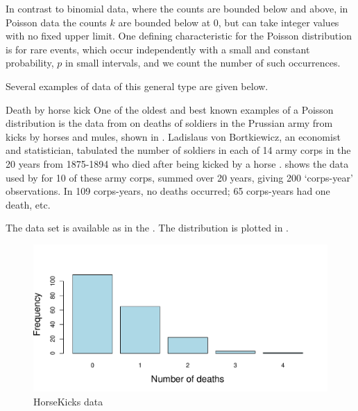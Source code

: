 \documentclass[11pt]{book}
\renewenvironment{knitrout}{\small\renewcommand{\baselinestretch}{.85}}{} %
\begin{document}
In contrast to binomial data, where the counts are bounded below and above,
in Poisson data the counts $k$ are bounded below at 0, but can take integer
values with no fixed upper limit.
One defining characteristic for the Poisson distribution is for rare
events, which occur independently with a small and constant probability, $p$
in small intervals, and we count the number of such occurrences.

Several examples of data of this general type are given below.

\begin{Example}[horskick1]{Death by horse kick}
One of the oldest and best known examples of a Poisson distribution
is the data from
\citet{Bortkiewicz:98} on deaths of soldiers in the Prussian
army from kicks by horses and mules, shown in .
Ladislaus von Bortkiewicz, an economist and statistician,
tabulated the number of soldiers in each of
14 army corps in the 20 years from 1875-1894
who died after being kicked by a horse
\citep[p. 18]{AndrewsHerzberg:85}.
 shows the data used by
\citet{Fisher:25} for 10 of these
army corps, summed over 20 years, giving 200
`corps-year' observations.  In 109 corps-years,
no deaths occurred; 65 corps-years had one death, etc.

The data set is available as  in the .
The distribution is plotted in .


\begin{knitrout}
\color{fgcolor}\begin{kframe}
\begin{alltt}
 \hlstd{=}\hlstd{)}
 \hlstd{=}\hlstd{,} \hlstd{=}\hlstd{,}
        \hlstd{=}\hlstd{,} \hlstd{=}\hlstd{)}
\end{alltt}
\end{kframe}\begin{figure}[!htbp]


\centerline{\includegraphics[width=.75\textwidth]{ch03/fig/horsekicks} }

\caption[HorseKicks data]{HorseKicks data\label{fig:horsekicks}}
\end{figure}


\end{knitrout}
\end{Example}
\end{document}
